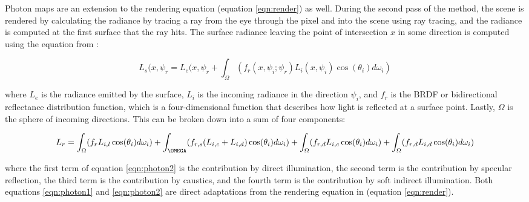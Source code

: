 Photon maps are an extension to the rendering equation (equation \ref{eqn:render}) as well.  During the second pass of the method, the scene is rendered by calculating the radiance by tracing a ray from the eye through the pixel and into the scene using ray tracing, and the radiance is computed at the first surface that the ray hits.  The surface radiance leaving the point of intersection $x$ in some direction is computed using the equation from \cite{Jensen1996}:

\begin{equation}
L_{s}(x,\psi_{r} = L_{e}(x,\psi_{r} + \int_{\Omega}(f_{r}(x,\psi_{i};\psi_{r})L_{i}(x,\psi_{i})\cos(\theta_{i})d\omega_{i}) \label{eqn:photon1}
\end{equation}

where $L_{e}$ is the radiance emitted by the surface, $L_{i}$ is the incoming radiance in the direction $\psi_{i}$, and $f_{r}$ is the BRDF or bidirectional reflectance distribution function, which is a four-dimensional function that describes how light is reflected at a surface point.  Lastly, $\Omega$ is the sphere of incoming directions.  This can be broken down into a sum of four components:

\begin{equation}
L_{r} = \int_{\Omega} (f_{r}L_{i,l}\cos(\theta_{i})d\omega_{i}) + \int_{\OMEGA}(f_{r,s}(L_{i,c}+L_{i,d})\cos(\theta_{i})d\omega_{i}) + \int_{\Omega} (f_{r,d}L_{i,c}\cos(\theta_{i})d\omega_{i}) + \int_{\Omega}(f_{r,d}L_{i,d}\cos(\theta_{i})d\omega_{i}) \label{eqn:photon2}
\end{equation}

where the first term of equation \ref{eqn:photon2} is the contribution by direct illumination, the second term is the contribution by specular reflection, the third term is the contribution by caustics, and the fourth term is the contribution by soft indirect illumination.  Both equations \ref{eqn:photon1} and \ref{eqn:photon2} are direct adaptations from the rendering equation in \cite{Kajiya1986} (equation \ref{eqn:render}).
















